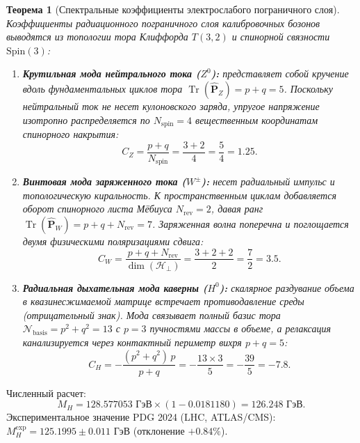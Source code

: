 \documentclass[11pt,a4paper]{article}
\newtheorem{theorem}{Теорема}
\theoremstyle{definition}
\theoremstyle{remark}
\begin{document}
\begin{theorem}[Спектральные коэффициенты электрослабого пограничного слоя]
\label{thm:electroweak_boundary_coefficients_exact}
Коэффициенты радиационного пограничного слоя калибровочных бозонов выводятся из топологии тора Клиффорда $T(3,2)$ и спинорной связности $\mathrm{Spin}(3)$:
\begin{enumerate}
\item \textbf{Крутильная мода нейтрального тока ($Z^0$):} представляет собой кручение вдоль фундаментальных циклов тора $\operatorname{Tr}(\hat{\mathbf{P}}_Z) = p + q = 5$. Поскольку нейтральный ток не несет кулоновского заряда, упругое напряжение изотропно распределяется по $N_{\mathrm{spin}} = 4$ вещественным координатам спинорного накрытия:
\begin{equation}
C_Z = \frac{p + q}{N_{\mathrm{spin}}} = \frac{3 + 2}{4} = \frac{5}{4} = 1.25.
\label{eq:C_Z_exact_derived}
\end{equation}
\item \textbf{Винтовая мода заряженного тока ($W^\pm$):} несет радиальный импульс и топологическую киральность. К пространственным циклам добавляется оборот спинорного листа Мёбиуса $N_{\mathrm{rev}} = 2$, давая ранг $\operatorname{Tr}(\hat{\mathbf{P}}_W) = p + q + N_{\mathrm{rev}} = 7$. Заряженная волна поперечна и поглощается двумя физическими поляризациями сдвига:
\begin{equation}
C_W = \frac{p + q + N_{\mathrm{rev}}}{\dim(\mathcal{H}_\perp)} = \frac{3 + 2 + 2}{2} = \frac{7}{2} = 3.5.
\label{eq:C_W_exact_derived}
\end{equation}

\item \textbf{Радиальная дыхательная мода каверны ($H^0$):} скалярное раздувание объема в квазинесжимаемой матрице встречает противодавление среды (отрицательный знак). Мода связывает полный базис тора $\mathcal{N}_{\mathrm{basis}} = p^2 + q^2 = 13$ с $p=3$ пучностями массы в объеме, а релаксация канализируется через контактный периметр вихря $p+q = 5$:
\begin{equation}
C_H = -\frac{(p^2 + q^2) \, p}{p + q} = -\frac{13 \times 3}{5} = -\frac{39}{5} = -7.8.
\label{eq:C_H_exact_derived}
\end{equation}
\end{enumerate}
\end{theorem}
Численный расчет:
\begin{equation}
	M_H = 128.577053\text{ ГэВ} \times (1 - 0.0181180) = 126.248\text{ ГэВ}.
\label{eq:higgs_mass_val_numerical}
\end{equation}
Экспериментальное значение PDG 2024 (LHC, ATLAS/CMS): $M_H^{\mathrm{exp}} = 125.1995 \pm 0.011\text{ ГэВ}$ (отклонение $+0.84\%$).
\end{document}
